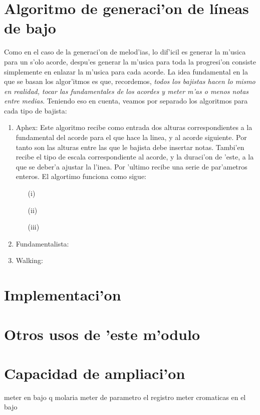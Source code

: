\section{Algoritmo de generaci'on de l\'ineas de bajo}
Como en el caso de la generaci'on de melod'ias, lo dif'icil es generar la m'usica para un s'olo acorde, despu'es generar la m'usica para toda la progresi'on consiste simplemente en enlazar la m'usica para cada acorde. La idea fundamental en la que se basan los algor'itmos es que, recordemos, \emph{todos los bajistas hacen lo mismo en realidad, tocar las fundamentales de los acordes y meter m'as o menos notas entre medias}. Teniendo eso en cuenta, veamos por separado los algoritmos para cada tipo de bajista:
	\begin{enumerate}
	\item Aphex: Este algoritmo recibe como entrada dos alturas correspondientes a la fundamental del acorde para el que hace la linea, y al acorde siguiente. Por tanto son las alturas entre las que le bajista debe insertar notas. Tambi'en recibe  el tipo de escala correspondiente al acorde, y la duraci'on de 'este, a la que se deber'a ajustar la l'inea. Por 'ultimo recibe una serie de par'ametros enteros. El algortimo funciona como sigue:
		\begin{enumerate}
		\item[(i)] 
		\item[(ii)] 
		\item[(iii)] 
		\end{enumerate}


	\item Fundamentalista:
	\item Walking: 
	\end{enumerate}


\section{Implementaci'on}

\section {Otros usos de 'este m'odulo}

\section {Capacidad de ampliaci'on}
meter en bajo q molaria meter de parametro el registro
meter cromaticas en el bajo
